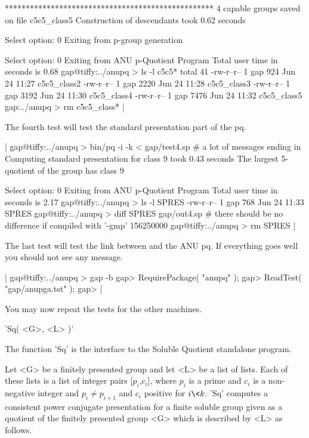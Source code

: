     **************************************************
    4 capable groups saved on file c5c5_class5
    Construction of descendants took 0.62 seconds

    Select option: 0 
    Exiting from p-group generation

    Select option: 0 
    Exiting from ANU p-Quotient Program
    Total user time in seconds is 0.68
    gap@tiffy:../anupq > ls -l c5c5*
    total 41
    -rw-r--r--    1 gap     924 Jun 24 11:27 c5c5_class2
    -rw-r--r--    1 gap    2220 Jun 24 11:28 c5c5_class3
    -rw-r--r--    1 gap    3192 Jun 24 11:30 c5c5_class4
    -rw-r--r--    1 gap    7476 Jun 24 11:32 c5c5_class5
    gap:../anupq > rm c5c5_class* |

The fourth test will test the standard presentation part of the pq.

|    gap@tiffy:../anupq > bin/pq -i -k < gap/test4.sp
    # a lot of messages ending in
    Computing standard presentation for class 9 took 0.43 seconds
    The largest 5-quotient of the group has class 9

    Select option: 0 
    Exiting from ANU p-Quotient Program
    Total user time in seconds is 2.17
    gap@tiffy:../anupq > ls -l SPRES
    -rw-r--r--  1 gap     768 Jun 24 11:33 SPRES
    gap@tiffy:../anupq > diff SPRES gap/out4.sp
    # there should be no difference if compiled with '-gmp'
    156250000
    gap@tiffy:../anupq > rm SPRES |

The last  test  will test the  link  between {\GAP} and   the ANU pq.  If
everything goes well you should not see any message.

|    gap@tiffy:../anupq > gap -b
    gap> RequirePackage( "anupq" );
    gap> ReadTest( "gap/anupga.tst" );
    gap> |

You may now repeat the tests for the other machines.


'Sq( <G>, <L> )'

The function  'Sq' is  the  interface to the  Soluble Quotient standalone
program.

Let <G> be  a finitely presented group  and let <L> be  a list  of lists.
Each of these lists is a list of integer pairs [$p_i$,$c_i$], where $p_i$
is  a prime and  $c_i$ is a  non-negative integer and $p_i \not= p_{i+1}$
and $c_i$ positive for  $i \< k$.   'Sq' computes a  consistent
power conjugate   presentation  for a  finite  soluble group  given  as a
quotient of the finitely presented group <G> which is described by <L> as
follows.

